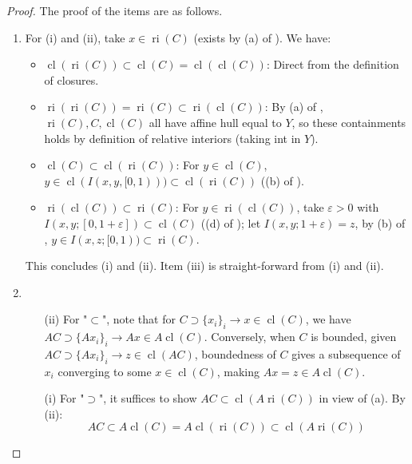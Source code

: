 \begin{proof}The proof of the items are as follows.
	\begin{enumerate}[label=(\alph*)]
		\item For (i) and (ii), take $x\in \operatorname{ri}(C)$ (exists by (a) of ). We have:
		      \begin{itemize}
			      \item $\operatorname{cl}(\operatorname{ri}(C))\subset\operatorname{cl}(C)=\operatorname{cl}(\operatorname{cl}(C))$: Direct from the definition of closures.
			      \item $\operatorname{ri}(\operatorname{ri}(C))=\operatorname{ri}(C)\subset\operatorname{ri}(\operatorname{cl}(C))$: By (a) of , $\operatorname{ri}(C),C,\operatorname{cl}(C)$ all have affine hull equal to $Y$, so these containments holds by definition of relative interiors (taking int in $Y$).
			      \item $\operatorname{cl}(C)\subset \operatorname{cl}(\operatorname{ri}(C))$: For $y\in \operatorname{cl}(C)$, $y\in \operatorname{cl}(I(x,y,[0, 1)))\subset \operatorname{cl}(\operatorname{ri}(C))$ ((b) of ).
			      \item $\operatorname{ri}(\operatorname{cl}(C))\subset \operatorname{ri}(C)$: For $y\in \operatorname{ri}(\operatorname{cl}(C))$, take $\varepsilon>0$ with $I(x,y;[0,1+\varepsilon ])\subset \operatorname{cl}(C)$ ((d) of ); let $I(x,y;1+\varepsilon)=z$, by (b) of , $y\in I(x,z;[0, 1))\subset \operatorname{ri}(C)$.
		      \end{itemize}
		      This concludes (i) and (ii). Item (iii) is straight-forward from (i) and (ii).
		\item
		      \begin{itemize}
			      \item[(ii)] For "$\subset$", note that for $C\supset \{x_i\}_i\to x\in \operatorname{cl}(C)$, we have $AC\supset \{Ax_i\}_{i}\to Ax\in A\operatorname{cl}(C)$. Conversely, when $C$ is bounded, given $AC\supset \{Ax_i\}_i\to z\in \operatorname{cl}(AC)$, boundedness of $C$ gives a subsequence of $x_i$ converging to some $x\in \operatorname{cl}(C)$, making $Ax=z\in A\operatorname{cl}(C)$.
			      \item[(i)] For "$\supset$", it suffices to show $AC\subset \operatorname{cl}(A \operatorname{ri}(C))$ in view of (a). By (ii):
			            \[
				            AC\subset A \operatorname{cl}(C) = A\operatorname{cl}(\operatorname{ri}(C)) \subset \operatorname{cl}(A \operatorname{ri}(C))
\]
\end{itemize}
\end{enumerate}
\end{proof}
